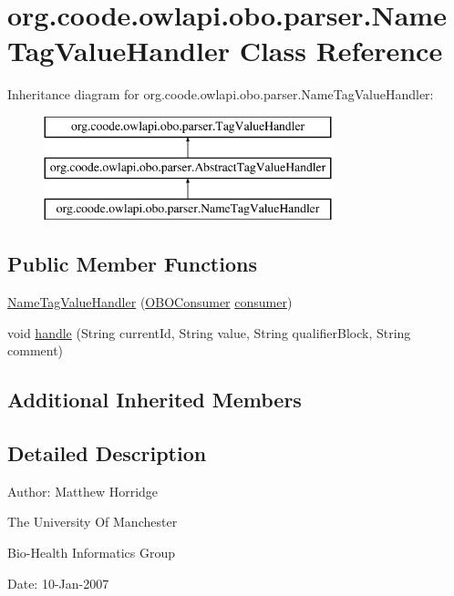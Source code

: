 \hypertarget{classorg_1_1coode_1_1owlapi_1_1obo_1_1parser_1_1_name_tag_value_handler}{\section{org.\-coode.\-owlapi.\-obo.\-parser.\-Name\-Tag\-Value\-Handler Class Reference}
\label{classorg_1_1coode_1_1owlapi_1_1obo_1_1parser_1_1_name_tag_value_handler}
}
Inheritance diagram for org.\-coode.\-owlapi.\-obo.\-parser.\-Name\-Tag\-Value\-Handler\-:\begin{figure}[H]
\begin{center}
\leavevmode
\includegraphics[height=3.000000cm]{classorg_1_1coode_1_1owlapi_1_1obo_1_1parser_1_1_name_tag_value_handler}
\end{center}
\end{figure}
\subsection*{Public Member Functions}
\begin{DoxyCompactItemize}
\item 
\hyperlink{classorg_1_1coode_1_1owlapi_1_1obo_1_1parser_1_1_name_tag_value_handler_a43ced9ec3893335dd3dae3d097c68dde}{Name\-Tag\-Value\-Handler} (\hyperlink{classorg_1_1coode_1_1owlapi_1_1obo_1_1parser_1_1_o_b_o_consumer}{O\-B\-O\-Consumer} \hyperlink{classorg_1_1coode_1_1owlapi_1_1obo_1_1parser_1_1_abstract_tag_value_handler_ab27f1ff22d15640c5f81585f18265137}{consumer})
\item 
void \hyperlink{classorg_1_1coode_1_1owlapi_1_1obo_1_1parser_1_1_name_tag_value_handler_ac9857d956de40fa84f5fbeb874565940}{handle} (String current\-Id, String value, String qualifier\-Block, String comment)
\end{DoxyCompactItemize}
\subsection*{Additional Inherited Members}


\subsection{Detailed Description}
Author\-: Matthew Horridge\par
 The University Of Manchester\par
 Bio-\/\-Health Informatics Group\par
 Date\-: 10-\/\-Jan-\/2007\par
\par
 

